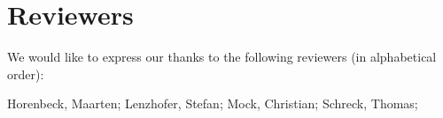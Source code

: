 \section{Reviewers}

We would like to express our thanks to the following reviewers (in alphabetical order):

Horenbeck, Maarten;
Lenzhofer, Stefan;
Mock, Christian; 
Schreck, Thomas; 

